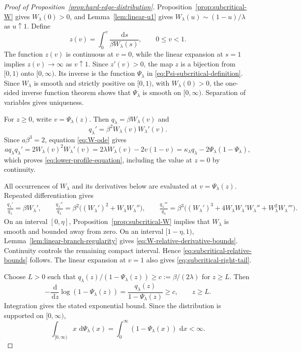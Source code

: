 \documentclass[12pt]{amsart}
\numberwithin{equation}{section}
\theoremstyle{plain}
\theoremstyle{definition}
\newcommand{\dd}{\,\mathrm d}
\begin{document}
\begin{proof}[Proof of Proposition~\ref{prop:hard-edge-distribution}]
Proposition~\ref{prop:subcritical-W} gives $W_{\lambda}(0)>0$, and
Lemma~\ref{lem:linear-u1} gives
$W_{\lambda}(u)\sim(1-u)/\lambda$ as $u\uparrow1$.  Define
\[
 z(v)=\int_0^v\frac{\dd s}{\beta W_{\lambda}(s)},
 \qquad 0\le v<1.
\]
The function $z(v)$ is continuous at $v=0$, while the linear expansion at $s=1$
implies $z(v)\to\infty$ as $v\uparrow1$.  Since $z'(v)>0$, the map $z$ is
a bijection from $[0,1)$ onto $[0,\infty)$.  Its inverse is the function
$\Psi_{\lambda}$ in \eqref{eq:Psi-subcritical-definition}.  Since
$W_{\lambda}$ is smooth and strictly positive on $[0,1)$, with
$W_{\lambda}(0)>0$, the one-sided inverse function theorem shows that
$\Psi_{\lambda}$ is smooth on $[0,\infty)$.  Separation of variables gives
uniqueness.

For $z\ge0$, write $v=\Psi_{\lambda}(z)$.  Then
$q_{\lambda}=\beta W_{\lambda}(v)$ and
\[
 q_{\lambda}'=\beta^2W_{\lambda}(v)W_{\lambda}'(v).
\]
Since $a\beta^3=2$, equation \eqref{eq:W-ode} gives
\[
 a q_{\lambda}q_{\lambda}'
 =2W_{\lambda}(v)^2W_{\lambda}'(v)
 =2\lambda W_{\lambda}(v)-2v(1-v)
 =\kappa_{\lambda}q_{\lambda}
  -2\Psi_{\lambda}(1-\Psi_{\lambda}),
\]
which proves \eqref{eq:lower-profile-equation}, including the value at
$z=0$ by continuity.

All occurrences of $W_{\lambda}$ and its derivatives below are evaluated at
$v=\Psi_{\lambda}(z)$.  Repeated differentiation gives
\[
\begin{aligned}
 \frac{q_{\lambda}'}{q_{\lambda}}
 =\beta W_{\lambda}',\qquad
 \frac{q_{\lambda}''}{q_{\lambda}}
 =\beta^2\bigl((W_{\lambda}')^2
   +W_{\lambda}W_{\lambda}''\bigr),\qquad
 \frac{q_{\lambda}'''}{q_{\lambda}}
 =\beta^3\bigl((W_{\lambda}')^3
   +4W_{\lambda}W_{\lambda}'W_{\lambda}''
   +W_{\lambda}^2W_{\lambda}'''\bigr).
\end{aligned}
\]
On an interval $[0,\eta]$, Proposition~\ref{prop:subcritical-W} implies that
$W_{\lambda}$ is smooth and bounded away from zero.  On an interval
$[1-\eta,1)$, Lemma~\ref{lem:linear-branch-regularity} gives
\eqref{eq:W-relative-derivative-bounds}.  Continuity controls the remaining
compact interval.  Hence \eqref{eq:subcritical-relative-bounds} follows.
The linear expansion at $v=1$ also gives
\eqref{eq:subcritical-right-tail}.

Choose $L>0$ such that
$q_{\lambda}(z)/(1-\Psi_{\lambda}(z))\ge
c:=\beta/(2\lambda)$ for $z\ge L$.  Then
\[
 -\frac{\dd}{\dd z}\log(1-\Psi_{\lambda}(z))
 =\frac{q_{\lambda}(z)}{1-\Psi_{\lambda}(z)}\ge c,
 \qquad z\ge L.
\]
Integration gives the stated exponential bound.  Since the distribution is
supported on $[0,\infty)$,
\[
 \int_{[0,\infty)}x\,\dd\Psi_{\lambda}(x)
 =\int_0^\infty(1-\Psi_{\lambda}(x))\,\dd x<\infty.
\]


\end{proof}
\end{document}
